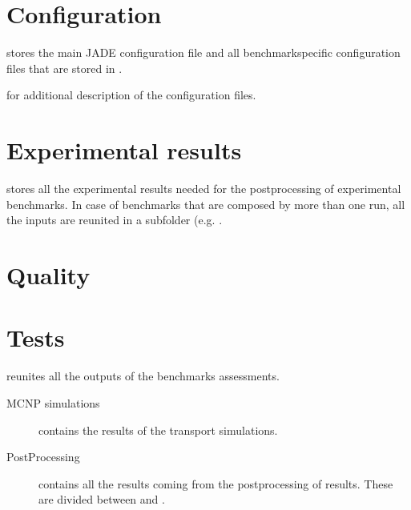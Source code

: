 \documentclass[letterpaper,10pt,english]{sphinxmanual}
\begin{document}
\section{Configuration}
\label{\detokenize{usage/folders:configuration}}
 stores the main JADE configuration file  and all benchmark\sphinxhyphen{}specific configuration
files that are stored in .




{\hyperref[\detokenize{usage/configuration:config}]{}} for additional description of the configuration files.




\section{Experimental results}
\label{\detokenize{usage/folders:experimental-results}}
 stores all the experimental results needed for the post\sphinxhyphen{}processing of
experimental benchmarks. In case of benchmarks that are composed by more than one run, all the inputs are reunited in a sub\sphinxhyphen{}folder
(e.g. .


\section{Quality}
\label{\detokenize{usage/folders:quality}}


\section{Tests}
\label{\detokenize{usage/folders:tests}}
 reunites all the outputs of the benchmarks assessments.
\begin{description}
\item[{MCNP simulations}] \leavevmode
contains the results of the transport simulations.

\item[{Post\sphinxhyphen{}Processing}] \leavevmode
contains all the results coming from the post\sphinxhyphen{}processing of results. These are divided between
 and .

\end{description}
\end{document}
